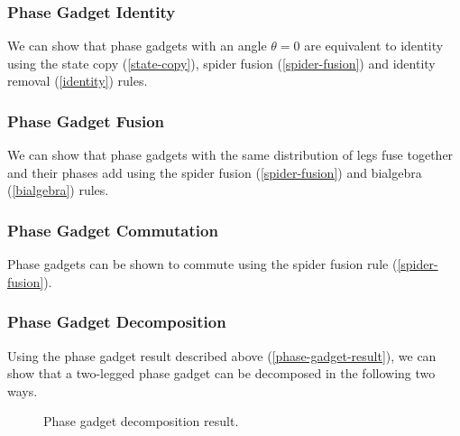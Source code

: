 
\subsubsection{Phase Gadget Identity}%

We can show that phase gadgets with an angle $\theta = 0$ are equivalent to identity using the state copy (\ref{state-copy}), spider fusion (\ref{spider-fusion}) and identity removal (\ref{identity}) rules.



\subsubsection{Phase Gadget Fusion}%
\label{phase-gadget-fusion}
We can show that phase gadgets with the same distribution of legs fuse together and their phases add using the spider fusion (\ref{spider-fusion}) and bialgebra (\ref{bialgebra}) rules.



\subsubsection{Phase Gadget Commutation}%
\label{phase-gadget-commutation}

Phase gadgets can be shown to commute using the spider fusion rule (\ref{spider-fusion}).



\subsubsection{Phase Gadget Decomposition}%

Using the phase gadget result described above (\ref{phase-gadget-result}), we can show that a two-legged phase gadget can be decomposed in the following two ways.

\begin{figure}[H]
    \centering
    \caption{Phase gadget decomposition result.}
    \label{phase-gadget-decomposition}
\end{figure}

